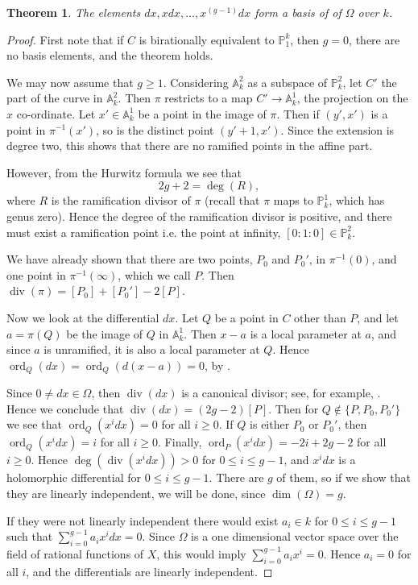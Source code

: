 \documentclass[11pt]{article} %
\newtheorem{thm}{Theorem}
\theoremstyle{remark}\newtheorem*{rem}{Remark}
\DeclareMathOperator{\ord}{ord}
\DeclareMathOperator{\di}{div}
\begin{document}
\begin{thm}
 The elements $dx, xdx, \ldots , x^{(g-1)}dx$ form a basis of  of $\Omega$ over $k$.
\end{thm}
\begin{proof}
First note that if $C$ is birationally equivalent to $\mathbb P_1^k$, then $g=0$, there are no basis elements, and the theorem holds.

We may now assume that $g\geq 1$.
Considering $\mathbb A_k^2$ as a subspace of $\mathbb P_k^2$, let $C'$ the part of the curve in $\mathbb A_k^2$.
Then $\pi$ restricts to a map $C'\rightarrow \mathbb A^1_k$, the projection on the $x$ co-ordinate.
Let $x'\in \mathbb A_k^1$ be a point in the image of $\pi$.
Then if $(y',x')$ is a point in $\pi^{-1}(x')$, so is the distinct point $(y'+1,x')$.
Since the extension is degree two, this shows that there are no ramified points in the affine part.

However, from the Hurwitz formula we see that
\[
 2g+2 = \deg (R),
\]
where $R$ is the ramification divisor of $\pi$ (recall that $\pi$ maps to $\mathbb P_k^1$, which has genus zero).
Hence the degree of the ramification divisor is positive, and there must exist a ramification point i.e. the point at infinity, $[0:1:0]\in \mathbb P_k^2$.


We have already shown that there are two points, $P_0$ and $P_0'$, in $\pi^{-1}(0)$, and one point in $\pi^{-1}(\infty)$, which we call $P$.
Then $\di(\pi) = [P_0] + [P_0'] - 2[P]$.

Now we look at the differential $d x$.
Let $Q$ be a point in $C$ other than $P$, and let $a= \pi(Q)$ be the image of $Q$ in $\mathbb A_k^1$.
Then $x-a$ is a local parameter at $a$, and since $a$ is unramified, it is also a local parameter at $Q$.
Hence $\ord_Q(dx)=\ord_Q(d(x-a)) = 0$, by  \citep[\S 8.5]{fulton}.

Since $0\neq dx \in \Omega$, then $\di (dx)$ is a canonical divisor; see, for example, \citep[\S 8.5]{fulton}.
Hence we conclude that $\di (dx) = (2g-2)[P]$.
Then for $Q\notin \{P,P_0,P_0'\}$ we see that $\ord_Q(x^idx)=0$ for all $i\geq 0$.
If $Q$ is either $P_0$ or $P_0'$, then $\ord_Q(x^idx)=i$ for all $i\geq 0$.
Finally, $\ord_P(x^idx)=-2i+2g-2$ for all $i\geq 0$.
Hence $\deg(\di (x^idx))>0$ for $0 \leq i \leq g-1$, and $x^idx$ is a holomorphic differential for $0 \leq i\leq g-1$.
There are $g$ of them, so if we show that they are linearly independent, we will be done, since $\dim(\Omega)=g$.



If they were not linearly independent there would exist $a_i\in k$ for $0\leq i \leq g-1$ such that $\sum_{i=0}^{g-1} a_ix^idx = 0$.
Since $\Omega$ is a one dimensional vector space over the field of rational functions of $X$, this would imply $\sum_{i=0}^{g-1} a_ix^i = 0$.
Hence $a_i = 0$ for all $i$, and the differentials are linearly independent. 
\end{proof}





\end{document}
